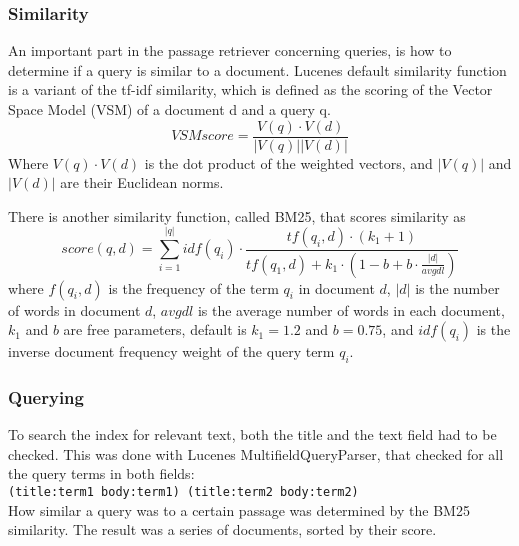 \subsubsection{Similarity}
An important part in the passage retriever concerning queries, is how to determine if a query is similar to a document.
Lucenes default similarity function is a variant of the tf-idf similarity, 
which is defined as the scoring of the Vector Space Model (VSM) of a document d and a query q.
\[VSM score = \frac{V(q)\cdot V(d)}{|V(q)||V(d)|} \]
Where $V(q) \cdot V(d)$ is the dot product of the weighted vectors, and $|V(q)|$ and $|V(d)|$ are their Euclidean norms.

There is another similarity function, called BM25, that scores similarity as
\[ score(q,d) = \sum_{i=1}^{|q|} idf(q_i) \cdot \frac{tf(q_i,d) \cdot (k_1 + 1)}{tf(q_1,d) + k_1 \cdot (1 - b + b \cdot \frac{|d|}{avgdl})} \]
where $f(q_i,d)$ is the frequency of the term $q_i$ in document $d$, 
$|d|$ is the number of words in document $d$,
$avgdl$ is the average number of words in each document,
$k_1$ and $b$ are free parameters, default is $k_1 = 1.2$ and $b = 0.75$,
and $idf(q_i)$ is the inverse document frequency weight of the query term $q_i$.

\subsubsection{Querying}
To search the index for relevant text, both the title and the text field had to be checked. 
This was done with Lucenes MultifieldQueryParser, that checked for all the query terms in both fields: \\
\texttt{(title:term1 body:term1) (title:term2 body:term2)} \\
How similar a query was to a certain passage was determined by the BM25 similarity.
The result was a series of documents, sorted by their score.
